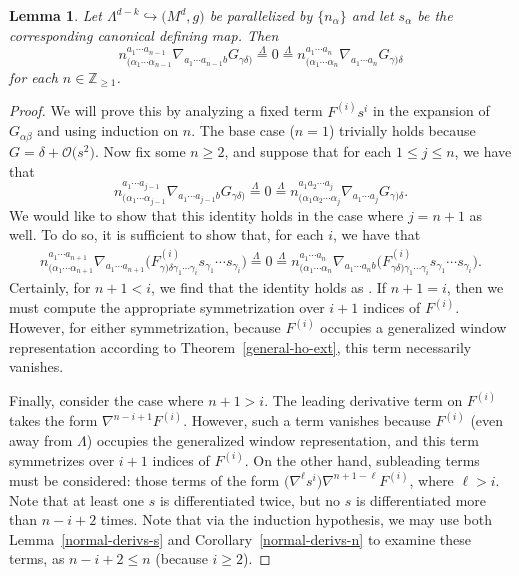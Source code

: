 \documentclass[10pt,a4paper]{article}
\numberwithin{equation}{section}
\newtheorem{Lemma}[Theorem]{Lemma}
\renewcommand{\=}{\stackrel \Lambda =}
\begin{document}
\begin{Lemma} \label{symmetric-deriv-G}
Let $\Lambda^{d-k} \hookrightarrow \bigl(M^d,g\bigr)$ be parallelized by $\{n_{\alpha}\}$ and let $s_{\alpha}$ be the corresponding canonical defining map.
Then
\[n^{a_1 \cdots a_{n-1}}_{(\alpha_1 \cdots \alpha_{n-1}} \nabla_{a_1 \cdots a_{n-1} b} G_{\gamma \delta)} \= 0 \= n^{a_1 \cdots a_n}_{(\alpha_1 \cdots \alpha_n} \nabla_{a_1 \cdots a_n} G_{\gamma) \delta} \]
for each $n \in \mathbb{Z}_{\geq 1}$.
\end{Lemma}
\begin{proof}
We will prove this by analyzing a fixed term $F^{(i)}s^i$ in the expansion of $G_{\alpha \beta}$ and using induction on $n$. The base case ($n=1$) trivially holds because $G = \delta + \mathcal{O}\bigl(s^2\bigr)$. Now fix some $n \geq 2$, and suppose that for each $1 \leq j \leq n$, we have that
\[n^{a_1 \cdots a_{j-1}}_{(\alpha_1 \cdots \alpha_{j-1}} \nabla_{a_1 \cdots a_{j-1} b} G_{\gamma \delta)} \= 0 \= n^{a_1 a_2 \cdots a_j}_{(\alpha_1 \alpha_2 \cdots \alpha_j} \nabla_{a_1 \cdots a_j} G_{\gamma) \delta} .\]
We would like to show that this identity holds in the case where $j=n+1$ as well. To do so, it is sufficient to show that, for each $i$, we have that
\begin{align} \label{decomp-window}
n^{a_1 \cdots a_{n+1}}_{(\alpha_1 \cdots \alpha_{n+1}} \nabla_{a_1 \cdots a_{n+1}} \bigl(F^{(i)}_{\gamma) \delta \gamma_1 \cdots \gamma_i} s_{\gamma_1} \cdots s_{\gamma_i}\bigr) \= 0 \= n^{a_1 \cdots a_{n}}_{(\alpha_1 \cdots \alpha_{n}} \nabla_{a_1 \cdots a_{n} b} \bigl(F^{(i)}_{\gamma \delta) \gamma_1 \cdots \gamma_i} s_{\gamma_1} \cdots s_{\gamma_i}\bigr) .\!
\end{align}
Certainly, for $n+1 < i$, we find that the identity holds as \smash{$\nabla^{n+1} s^i \= 0$}. If $n+1 = i$, then we must compute the appropriate symmetrization over $i+1$ indices of $F^{(i)}$. However, for either symmetrization, because $F^{(i)}$ occupies a generalized window representation according to Theorem~\ref{general-ho-ext}, this term necessarily vanishes.

Finally, consider the case where $n+1 > i$. The leading derivative term on $F^{(i)}$ takes the form $\nabla^{n-i+1} F^{(i)}$. However, such a term vanishes because $F^{(i)}$ (even away from $\Lambda$) occupies the generalized window representation, and this term symmetrizes over $i+1$ indices of $F^{(i)}$. On the other hand, subleading terms must be considered: those terms of the form $\bigl(\nabla^{\ell} s^i\bigr) \nabla^{n+1-\ell} F^{(i)}$, where $\ell > i$. Note that at least one $s$ is differentiated twice, but no $s$ is differentiated more than $n-i+2$ times. Note that via the induction hypothesis, we may use both Lemma~\ref{normal-derivs-s} and Corollary~\ref{normal-derivs-n} to examine these terms, as $n-i+2 \leq n$ (because $i \geq 2$).


\end{proof}
\end{document}
